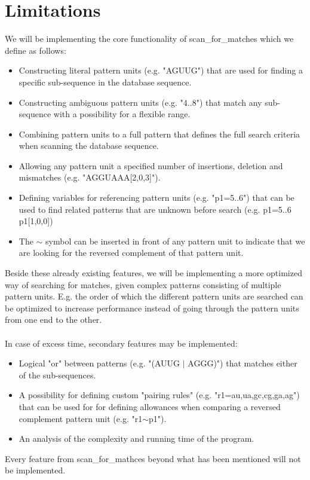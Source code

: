 \documentclass[12pt]{article}
\begin{document}
\section{Limitations}
We will be implementing the core functionality of scan\_for\_matches which we define as follows:
\begin{itemize}
\item Constructing literal pattern units (e.g. "AGUUG") that are used for finding a specific sub-sequence in the 
database sequence.
\item Constructing ambiguous pattern units (e.g. "4..8") that match any sub-sequence with a possibility for a 
flexible range.
\item Combining pattern units to a full pattern that defines the full search criteria when scanning the database sequence.
\item Allowing any pattern unit a specified number of insertions, deletion and mismatches (e.g. "AGGUAAA[2,0,3]").
\item Defining variables for referencing pattern units (e.g. "p1=5..6") that can be used 
to find related patterns that are unknown before search (e.g. p1=5..6 p1[1,0,0])
\item The $\sim$ symbol can be inserted in front of any pattern unit to indicate that we are looking for the reversed
complement of that pattern unit.
\end{itemize}
Beside these already existing features, we will be implementing a more optimized way of searching for matches, given
complex patterns consisting of multiple pattern units. E.g. the order of which the different pattern units are searched
can be optimized to increase performance instead of going through the pattern units from one end to the other. \\ \\
In case of excess time, secondary features may be implemented: 
\begin{itemize}
\item Logical "or" between patterns (e.g. "(AUUG $|$ AGGG)") that matches either of the sub-sequences.
\item A possibility for defining custom "pairing rules" (e.g. "r1={au,ua,gc,cg,ga,ag}") that can be used for 
for defining allowances when comparing a reversed complement pattern unit (e.g. "r1$\sim$p1").
\item An analysis of the complexity and running time of the program.
\end{itemize}
Every feature from scan\_for\_mathces beyond what has been mentioned will not be implemented.
\end{document}
